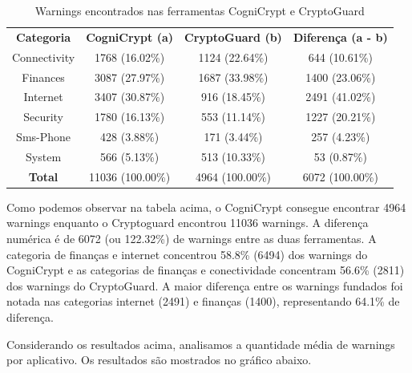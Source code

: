 \begin{table}[!htbp]
  \centering
  \begin{tabular}{|c|c|c|c|}
  
\textbf{Categoria}   & \textbf{CogniCrypt (a)}   &  \textbf{CryptoGuard (b)}     &  \textbf{Diferença (a - b)} \\ 
Connectivity           & \num{1768} (\num{16.02}\%)  &  \num{1124} (\num{22.64}\%)  & \num{644} (\num{10.61}\%) \\
Finances                &     \num{3087} (\num{27.97}\%)     &     \num{1687} (\num{33.98}\%)     &     \num{1400} (\num{23.06}\%)\\
Internet                 &     \num{3407} (\num{30.87}\%)     &     \num{916} (\num{18.45}\%)     &     \num{2491} (\num{41.02}\%)\\
Security                 &     \num{1780} (\num{16.13}\%)     &     \num{553} (\num{11.14}\%)     &     \num{1227} (\num{20.21}\%)\\
Sms-Phone            &     \num{428} (\num{3.88}\%)     &     \num{171} (\num{3.44}\%)     &     \num{257} (\num{4.23}\%)\\
System                  &     \num{566} (\num{5.13}\%)     &     \num{513} (\num{10.33}\%)     &     \num{53} (\num{0.87}\%)\\
\textbf{Total}                     &     \num{11036} (\num{100.00}\%)     &     \num{4964} (100.00\%)     &     \num{6072} (\num{100.00}\%)\\
\end{tabular}
    
  \caption{Warnings encontrados nas ferramentas CogniCrypt e CryptoGuard}
\label{AplicativosComWarning}
\end{table}

Como podemos observar na tabela acima, o CogniCrypt consegue encontrar 4964 warnings enquanto o Cryptoguard encontrou 11036 warnings. A diferença numérica é de 6072 (ou 122.32\%) de warnings entre as duas ferramentas. A categoria de finanças e internet concentrou 58.8\% (6494) dos warnings do CogniCrypt e as categorias de finanças e conectividade concentram 56.6\% (2811) dos warnings do CryptoGuard. A maior diferença entre os warnings fundados foi notada nas categorias internet (2491) e finanças (1400), representando 64.1\% de diferença. 

Considerando os resultados acima, analisamos a quantidade média de warnings por aplicativo. Os resultados são mostrados no gráfico abaixo.

